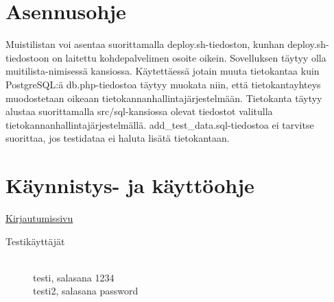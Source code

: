 \documentclass[a4paper, 12pt, finnish]{article}
\begin{document}
\section{Asennusohje}
Muistilistan voi asentaa suorittamalla deploy.sh-tiedoston, kunhan deploy.sh-tiedostoon on laitettu
kohdepalvelimen osoite oikein. Sovelluksen täytyy olla muitilista-nimisessä kansiossa. Käytettäessä jotain
muuta tietokantaa kuin PostgreSQL:ä db.php-tiedostoa täytyy muokata niin, että tietokantayhteys muodostetaan
oikeaan tietokannanhallintajärjestelmään. Tietokanta täytyy alustaa suorittamalla src/sql-kansiossa olevat
tiedostot valitulla tietokannanhallintajärjestelmällä. add\_test\_data.sql-tiedostoa ei tarvitse suorittaa, jos
testidataa ei haluta lisätä tietokantaan.

\section{Käynnistys- ja käyttöohje}

\href{https://oraisa.users.cs.helsinki.fi/muistilista}{Kirjautumissivu} \\
\begin{description}
  \item[Testikäyttäjät] \hfill \\
  testi, salasana 1234 \\
  testi2, salasana password
\end{description}
\end{document}
